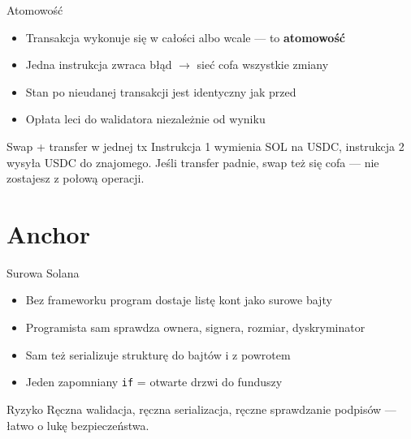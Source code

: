 \begin{frame}{Atomowość}
  \begin{itemize}
    \item Transakcja wykonuje się w całości albo wcale --- to \textbf{atomowość}
    \item Jedna instrukcja zwraca błąd $\to$ sieć cofa wszystkie zmiany
    \item Stan po nieudanej transakcji jest identyczny jak przed
    \item Opłata leci do walidatora niezależnie od wyniku
  \end{itemize}
  \vspace{0.25cm}
  \begin{exampleblock}{Swap + transfer w jednej tx}
    Instrukcja 1 wymienia SOL na USDC, instrukcja 2 wysyła USDC do znajomego.
    Jeśli transfer padnie, swap też się cofa --- nie zostajesz z połową operacji.
  \end{exampleblock}
\end{frame}

\section{Anchor}

\begin{frame}{Surowa Solana}
  \begin{itemize}
    \item Bez frameworku program dostaje listę kont jako surowe bajty
    \item Programista sam sprawdza ownera, signera, rozmiar, dyskryminator
    \item Sam też serializuje strukturę do bajtów i z powrotem
    \item Jeden zapomniany \texttt{if} = otwarte drzwi do funduszy
  \end{itemize}
  \vspace{0.25cm}
  \begin{alertblock}{Ryzyko}
    Ręczna walidacja, ręczna serializacja, ręczne sprawdzanie podpisów ---
    łatwo o lukę bezpieczeństwa.
  \end{alertblock}
\end{frame}

